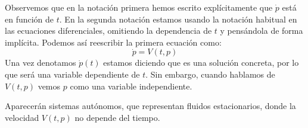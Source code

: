 \begin{observacion}
    Observemos que en la notación primera hemos escrito explícitamente que $\dot{p}$ está en función de $t$. En la segunda notación estamos usando la notación habitual en las ecuaciones diferenciales, omitiendo la dependencia de $t$ y pensándola de forma implícita. Podemos así reescribir la primera ecuación como:
    \begin{equation*}
        \dot{p} = V(t,p)
    \end{equation*}
    Una vez denotamos $\dot{p}(t)$ estamos diciendo que es una solución concreta, por lo que será una variable dependiente de $t$. Sin embargo, cuando hablamos de $V(t,p)$ vemos $p$ como una variable independiente.
\end{observacion}

\noindent
Aparecerán sistemas autónomos, que representan fluidos estacionarios, donde la velocidad $V(t,p)$ no depende del tiempo.\\

